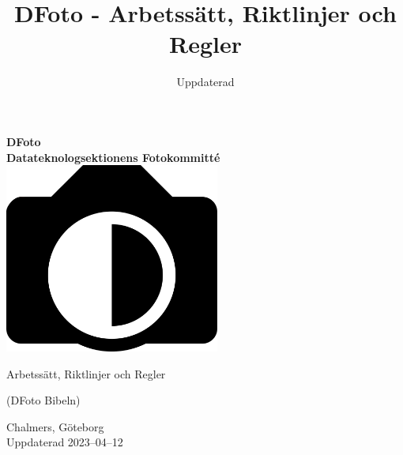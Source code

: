 \documentclass{dtek}
\title{DFoto - Arbetssätt, Riktlinjer och Regler }
\date{Uppdaterad \updated}
\newcommand{\updated}{2023--04--12}
\begin{document}
\makeheadfoot%

\begin{center}
    \vspace*{1cm}

    \Huge
    \textbf{DFoto}\\
    \textbf{Datateknologsektionens Fotokommitté}
    \vspace{0.5cm}\\
    \includegraphics[width=200pt]{dfotologo.jpg} \\    
    \vspace{2cm}
    \Huge
    \centerline{Arbetssätt, Riktlinjer och Regler}
    \centerline{(DFoto Bibeln)}

       

  
    
    {\LARGE Chalmers, Göteborg}\\

    {\LARGE Uppdaterad \updated}
\end{center}
\newpage

\setcounter{tocdepth}{2}
\tableofcontents

\newpage

\newpage
\newpage

\newpage

\newpage

\newpage

\newpage

\end{document}
